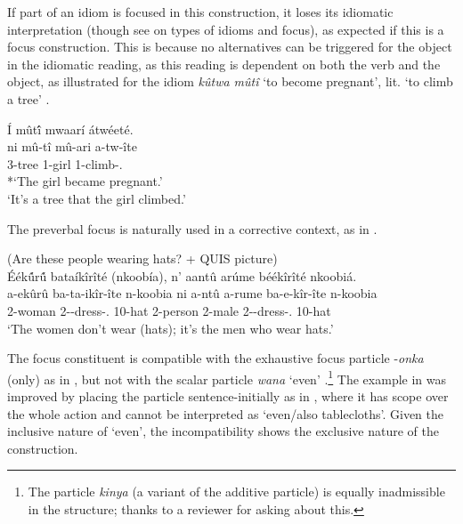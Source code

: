 \documentclass[output=paper]{langscibook}
\begin{document}
If part of an idiom is focused in this construction, it loses its idiomatic interpretation (though see \citealt{vanderWal2021} on types of idioms and focus), as expected if this is a focus construction. This is because no alternatives can be triggered for the object in the idiomatic reading, as this reading is dependent on both the verb and the object, as illustrated for the idiom \textit{kûtwa mûtî} ‘to become pregnant’, lit. ‘to climb a tree’ .

\ea
\label{bkm:Ref116896542}
Í mût\'{î} mwaarí átwéeté. \\
\gll
ni  mû-tî  mû-ari  a-tw-îte\\
\FOC{} 3-tree  1-girl 1\SM{}-climb-\STAT{}.\PFV{}\\
\glt
*`The girl became pregnant.’\\
‘It’s a tree that the girl climbed.’ \citep[10]{vanderWal2021}

\z

The preverbal focus is naturally used in a corrective context, as in .

\ea
\label{bkm:Ref116896557}
(Are these people wearing hats? + QUIS picture)\\
Éék\'{û}r\'{û}  bataíkîrîté (nkoobía), n’ aantû arúme béékîrîté nkoobiá.\\
\gll
a-ekûrû  ba-ta-ikîr-îte  n-koobia  ni  a-ntû  a-rume  ba-e-kîr-îte  n-koobia\\
2-woman 2\SM-\NEG{}-dress-\STAT.\PFV{} 10-hat \FOC{} 2-person  2-male 2\SM-\REFL{}-dress-\STAT.\PFV{} 10-hat\\
\glt ‘The women don’t wear (hats); it’s the men who wear hats.’

\z


The focus constituent is compatible with the exhaustive focus particle -\textit{onka} (only) as in , but not with the scalar particle \textit{wana} ‘even’ .\footnote{The particle \textit{kinya} (a variant of the additive particle) is equally inadmissible in the structure; thanks to a reviewer for asking about this.} The example in  was improved by placing the particle sentence-initially as in , where it has scope over the whole action and cannot be interpreted as ‘even/also tablecloths’. Given the inclusive nature of ‘even’, the incompatibility shows the exclusive nature of the construction.
\end{document}
